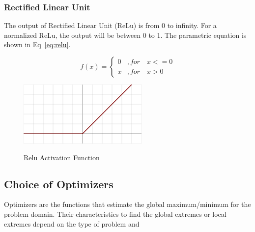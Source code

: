   \subsubsection{Rectified Linear Unit}
  The output of Rectified Linear Unit (ReLu) is from 0 to infinity. For a normalized ReLu, the output will be between 0 to 1. The parametric equation is shown in Eq~\ref{eq:relu}.

  
  \begin{equation}
    f(x) = 
      \begin{cases}
        0 & ,for \quad x <= 0 \\
        x & ,for \quad x > 0
      \end{cases}
      \label{eq:relu}
  \end{equation}

  \begin{figure}
    \centering
      \includegraphics[width=.45\textwidth]{mainmatter/3-Methodology/images/relu.png}
    \label{fig:relu}
    \caption{Relu Activation Function}
  \end{figure}

  
  \subsection{Choice of Optimizers}

  Optimizers are the functions that estimate the global maximum/minimum for the problem domain. Their characteristics to find the global extremes or local extremes depend on the type of problem and 
  


  
  \iffalse
